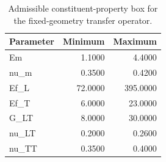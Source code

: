 \begin{table}
\centering
\small
\caption{Admissible constituent-property box for the fixed-geometry transfer operator.}
\label{tab:material_domain}
\begin{tabular}{lrr}
\toprule
Parameter & Minimum & Maximum \\
\midrule
Em & 1.1000 & 4.4000 \\
nu\_m & 0.3500 & 0.4200 \\
Ef\_L & 72.0000 & 395.0000 \\
Ef\_T & 6.0000 & 23.0000 \\
G\_LT & 8.0000 & 30.0000 \\
nu\_LT & 0.2000 & 0.2600 \\
nu\_TT & 0.3500 & 0.4000 \\
\bottomrule
\end{tabular}
\end{table}
